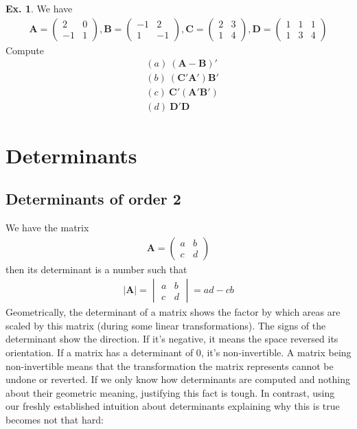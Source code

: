 \documentclass[10pt,a4paper]{book}
\theoremstyle{definition}\newtheorem{definition}{Definition}
\theoremstyle{definition}\newtheorem{fact}{Fact}
\theoremstyle{definition}\newtheorem{ex}{Ex.}
\theoremstyle{definition}\newtheorem{project}{Project}
\theoremstyle{definition}\newtheorem{problem}{Problem}
\theoremstyle{definition}\newtheorem{example}{Example}
\numberwithin{theorem}{chapter}
\numberwithin{corollary}{chapter}
\numberwithin{assumption}{chapter}
\numberwithin{definition}{chapter}
\numberwithin{prop}{chapter}
\numberwithin{notation}{chapter}
\numberwithin{problem}{chapter}
\numberwithin{example}{chapter}
\numberwithin{fact}{chapter}
\numberwithin{ex}{chapter}
\def\A{\mathbf A}
\def\B{\mathbf B}
\def\C{\mathbf C}
\def\D{\mathbf D}
\begin{document}
	\begin{ex}
		We have
		\begin{align*}
			\A = \begin{pmatrix}
				2 & 0 \\ -1 & 1
			\end{pmatrix}, 
			\B = \begin{pmatrix}
				-1 & 2 \\ 1 & -1
			\end{pmatrix}, 
			\C = \begin{pmatrix}
				2 & 3 \\ 1 & 4
			\end{pmatrix}, 
			\D = \begin{pmatrix}
				1 & 1 & 1 \\ 1 & 3 & 4
			\end{pmatrix}
		\end{align*}
		Compute
		\begin{align*}
			& (a) \ (\A - \B)'    \\
			& (b) \ (\C' \A') \B' \\
			& (c) \ \C' (\A' \B') \\
			& (d) \ \D' \D        
		\end{align*}
	\end{ex}
	
	\section{Determinants}
	\subsection{Determinants of order 2}
	We have the matrix
	\begin{align*}
		\A = \begin{pmatrix}
			a & b \\
			c & d 
		\end{pmatrix}
	\end{align*}
	then its determinant is a number such that
	\begin{align*}
		|\A| = \begin{vmatrix}
			a & b \\ c & d
		\end{vmatrix} = ad - cb
	\end{align*}
	Geometrically, the determinant of a matrix shows the factor by which areas are scaled by this matrix (during some linear transformations). The signs of the determinant show the direction. If it's negative, it means the space reversed its orientation. If a matrix has a determinant of 0, it's non-invertible. A matrix being non-invertible means that the transformation the matrix represents cannot be undone or reverted. If we only know how determinants are computed and nothing about their geometric meaning, justifying this fact is tough. In contrast, using our freshly established intuition about determinants explaining why this is true becomes not that hard:
	
\end{document}
